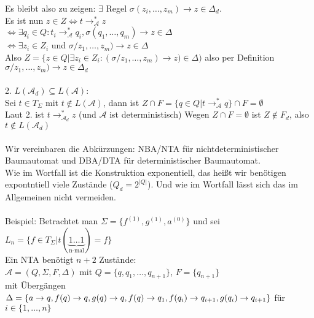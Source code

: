 \documentclass[titlepage]{article}
\begin{document}
Es bleibt also zu zeigen: $ \exists$ Regel $\sigma (z_i, \dots, z_m) \rightarrow z 
\in \Delta_d$.\\
Es ist nun $ z \in Z \Leftrightarrow t \rightarrow ^\ast_\mathcal{A} z$ \\
$\Leftrightarrow \exists q_i \in Q: t_i \rightarrow ^\ast_\mathcal{A} q_i, 
\sigma(q_1, \dots, q_m) \rightarrow z \in \Delta$\\
$\Leftrightarrow \exists z_i \in Z_i$ und $\sigma/z_1, \dots , z_m) \rightarrow z 
\in \Delta$ \\
Also $Z= \{z\in Q | \exists z_i \in Z_i : (\sigma/z_1, \dots , z_m) \rightarrow z ) 
\in \Delta)$ also per Definition
$\sigma/z_1, \dots , z_m) \rightarrow z \in \Delta_d$\\ \\

2. \glqq$L(\mathcal{A}_d) \subseteq L(\mathcal{A})$\grqq:\\

Sei $t \in T_\Sigma$ mit $t \notin L(\mathcal{A})$, 
dann ist $Z \cap F = \{ q \in Q | t \rightarrow^\ast_\mathcal{A} q \} \cap F = \emptyset$\\
Laut 2. ist $t \rightarrow ^\ast_{\mathcal{A}_d} z$ (und $\mathcal{A}$ ist deterministisch)
Wegen $Z \cap F = \emptyset$ ist $Z \notin F_d$, also $t \notin L(\mathcal{A}_d)$ \\ \\

Wir vereinbaren die Abk\"urzungen: NBA/NTA f\"ur nichtdeterministischer Baumautomat 
und DBA/DTA f\"ur deterministischer Baumautomat.\\
Wie im Wortfall ist die Konstruktion exponentiell, das hei\ss t wir ben\"otigen 
expontntiell viele Zust\"ande ($Q_d = 2^{|Q|}$).
Und wie im Wortfall l\"asst sich das im Allgemeinen nicht vermeiden.\\ \\
Beispiel: Betrachtet man $\Sigma = \{ f^{(1)}, g^{(1)}, a^{(0)}\}$ und
sei $L_n = \{ f \in T_\Sigma | t( \underbrace{1 \dots 1}_\text{n-mal} ) = f \}$ \\

Ein NTA ben\"otigt $n+2$ Zust\"ande:\\
$\mathcal{A} = (Q, \Sigma, F, \Delta)$ mit $Q = \{q, q_1, \dots , q_{n+1} \}$, 
$F = \{q_{n+1}\}$ \\ mit \"Uberg\"angen
$\Delta = \{a \rightarrow q, f(q) \rightarrow q, g(q) \rightarrow q, f(q) \rightarrow q_1, \\
f(q_i) \rightarrow q_{i+1}, g(q_i) \rightarrow q_{i+1} \}$ f\"ur $i \in \{1, \dots ,n\}$\\
\end{document}
